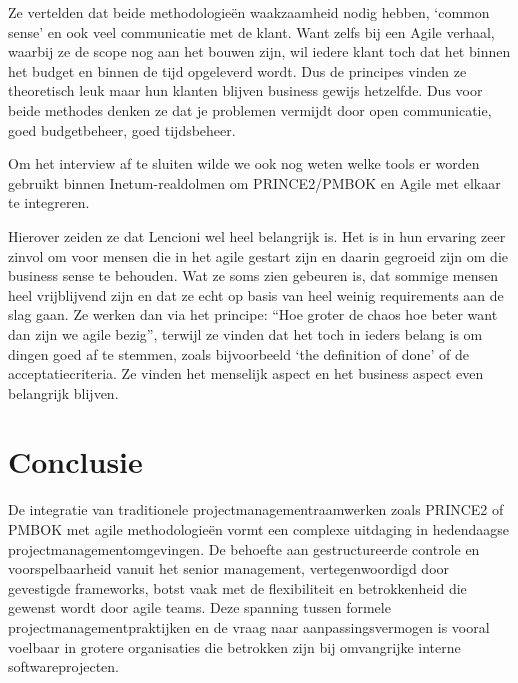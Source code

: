\documentclass[dutch]{hogent-article}
\begin{document}
Ze vertelden dat beide methodologieën waakzaamheid nodig hebben, ‘common sense’ en ook veel communicatie met de klant. Want zelfs bij een Agile verhaal, waarbij ze de scope nog aan het bouwen zijn, wil iedere klant toch dat het binnen het budget en binnen de tijd opgeleverd wordt. Dus de principes vinden ze theoretisch leuk maar hun klanten blijven business gewijs hetzelfde. Dus voor beide methodes denken ze dat je problemen vermijdt door open communicatie, goed budgetbeheer, goed tijdsbeheer.
\newline

Om het interview af te sluiten wilde we ook nog weten welke tools er worden gebruikt binnen Inetum-realdolmen om PRINCE2/PMBOK en Agile met elkaar te integreren. 
\newline

Hierover zeiden ze dat Lencioni wel heel belangrijk is. Het is in hun ervaring zeer zinvol om voor mensen die in het agile gestart zijn en daarin gegroeid zijn om die business sense te behouden. Wat ze soms zien gebeuren is, dat sommige mensen heel vrijblijvend zijn en dat ze echt op basis van heel weinig requirements aan de slag gaan. Ze werken dan via het principe: “Hoe groter de chaos hoe beter want dan zijn we agile bezig”, terwijl ze vinden dat het toch in ieders belang is om dingen goed af te stemmen, zoals bijvoorbeeld ‘the definition of done’ of de acceptatiecriteria. \linebreak Ze vinden het menselijk aspect en het business aspect even belangrijk blijven.
\newline
\newline


\section{Conclusie}%
\label{sec:conclusie}
De integratie van traditionele projectmanagementraamwerken zoals PRINCE2 of PMBOK met agile methodologieën vormt een complexe uitdaging in hedendaagse projectmanagementomgevingen. De behoefte aan gestructureerde controle en voorspelbaarheid vanuit het senior management, \linebreak vertegenwoordigd door gevestigde frameworks, botst vaak met de flexibiliteit en betrokkenheid die gewenst wordt door agile teams. Deze spanning tussen formele projectmanagementpraktijken en de vraag naar aanpassingsvermogen is vooral voelbaar in grotere organisaties die betrokken zijn bij omvangrijke interne softwareprojecten.
\newline
\end{document}
